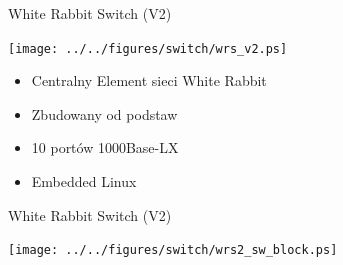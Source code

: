 \documentclass[compress,red]{beamer}
\begin{document}
\begin{frame}{White Rabbit Switch (V2)}

    \begin{center}
    \texttt{[image: ../../figures/switch/wrs\_v2.ps]}
    \end{center}

	\begin{itemize}
	\item Centralny Element sieci White Rabbit
	\item Zbudowany od podstaw
	\item 10 portów 1000Base-LX 
	\item Embedded Linux
	\end{itemize}
\end{frame}
\begin{frame}{White Rabbit Switch (V2)}

    \begin{center}
    \texttt{[image: ../../figures/switch/wrs2\_sw\_block.ps]}
    \end{center}


\end{frame}
\end{document}
